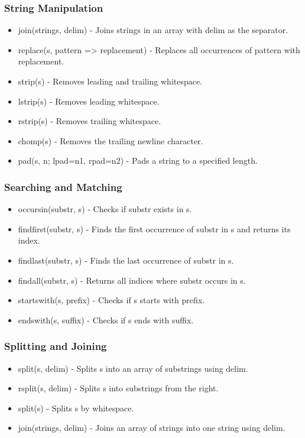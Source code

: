 \documentclass{report}
\begin{document}
    \bigbreak \noindent 
    \subsubsection{String Manipulation}
    \begin{itemize}
        \item join(strings, delim) - Joins strings in an array with delim as the separator.
        \item replace(s, pattern => replacement) - Replaces all occurrences of pattern with replacement.
        \item strip(s) - Removes leading and trailing whitespace.
        \item lstrip(s) - Removes leading whitespace.
        \item rstrip(s) - Removes trailing whitespace.
        \item chomp(s) - Removes the trailing newline character.
        \item pad(s, n; lpad=n1, rpad=n2) - Pads a string to a specified length.
    \end{itemize}

    \bigbreak \noindent 
    \subsubsection{Searching and Matching}
    \begin{itemize}
        \item occursin(substr, s) - Checks if substr exists in s.
        \item findfirst(substr, s) - Finds the first occurrence of substr in s and returns its index.
        \item findlast(substr, s) - Finds the last occurrence of substr in s.
        \item findall(substr, s) - Returns all indices where substr occurs in s.
        \item startswith(s, prefix) - Checks if s starts with prefix.
        \item endswith(s, suffix) - Checks if s ends with suffix.
    \end{itemize}

    \bigbreak \noindent 
    \subsubsection{Splitting and Joining}
    \begin{itemize}
        \item split(s, delim) - Splits s into an array of substrings using delim.
        \item rsplit(s, delim) - Splits s into substrings from the right.
        \item split(s) - Splits s by whitespace.
        \item join(strings, delim) - Joins an array of strings into one string using delim.
    \end{itemize}
\end{document}
